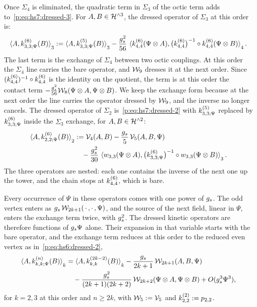 Once $\Sigma_4$ is eliminated, the quadratic term in $\Sigma_3$ of the octic term adds to~\eqref{p:eq:hs7:dressed-3}.
For $A, B \in \mathcal{H}^{\wedge 3}$, the dressed operator of $\Sigma_3$ at this order is:
\begin{equation}
  \label{p:eq:hs8:dressed-3}
  \pair[3]{A}{\kin{3}{\Psi}{6}(B)}
    := \pair[3]{A}{\kin{3}{\Psi}{5}(B)}
      - \frac{\gs^2}{56} \, \pair[4]{\kin{4}{}{6}(\Psi \otimes A)}{\big( \kin{4}{}{6} \big)^{-1} \circ \kin{4}{}{6}(\Psi \otimes B)}.
\end{equation}
The last term is the exchange of $\Sigma_4$ between two octic couplings.
At this order the $\Sigma_4$ line carries the bare operator, and $\mathcal{W}_{9}$ dresses it at the next order.
Since $(\kin{4}{}{6})^{-1} \circ \kin{4}{}{6}$ is the identity on the quotient, the term is at this order the contact term $- \tfrac{g_s^2}{56} \mathcal{W}_{8}(\Psi \otimes A, \Psi \otimes B)$.
We keep the exchange form because at the next order the line carries the operator dressed by $\mathcal{W}_{9}$, and the inverse no longer cancels.
The dressed operator of $\Sigma_2$ is~\eqref{p:eq:hs7:dressed-2} with $\kin{3}{\Psi}{5}$ replaced by $\kin{3}{\Psi}{6}$ inside the $\Sigma_3$ exchange, for $A, B \in \mathcal{H}^{\wedge 2}$:
\begin{equation}
  \label{p:eq:hs8:dressed-2}
  \begin{aligned}
    \pair[2]{A}{\kin{2}{\Psi}{6}(B)}
      &
      := \vertex{4}(A, B)
        - \frac{\gs}{5} \, \vertex{5}(A, B, \Psi)
      \\ &
      \quad
      - \frac{\gs^2}{30} \, \pair[3]{\wprod{3}{3}(\Psi \otimes A)}{\big( \kin{3}{\Psi}{6} \big)^{-1} \circ \wprod{3}{3}(\Psi \otimes B)}.
  \end{aligned}
\end{equation}
The three operators are nested: each one contains the inverse of the next one up the tower, and the chain stops at $\kin{4}{}{6}$, which is bare.


Every occurrence of $\Psi$ in these operators comes with one power of $g_s$.
The odd vertex enters as $g_s \, \mathcal{W}_{2 k + 1}(\, \cdot \,, \cdot \,, \Psi)$, and the source of the next field, linear in $\Psi$, enters the exchange term twice, with $g_s^2$.
The dressed kinetic operators are therefore functions of $g_s \Psi$ alone.
Their expansion in that variable starts with the bare operator, and the exchange term reduces at this order to the reduced even vertex as in~\eqref{p:eq:hs6:dressed-2},
\begin{equation}
  \label{p:eq:hs8:scaling}
  \begin{aligned}
    \pair[k]{A}{\kin{k}{\Psi}{n}(B)}
      &
      = \pair[k]{A}{\kin{k}{}{2 k - 2}(B)}
        - \frac{\gs}{2 k + 1} \, \dvertex{2 k + 1}(A, B, \Psi)
      \\ &
      \quad
      - \frac{\gs^2}{(2 k + 1) (2 k + 2)} \, \dvertex{2 k + 2}(\Psi \otimes A, \Psi \otimes B)
        + O(\gs^3 \Psi^3),
  \end{aligned}
\end{equation}
for $k = 2, 3$ at this order and $n \ge 2 k$, with $\mathcal{W}_{5} := \mathcal{V}_{5}$ and $\kin{2}{}{2} := \sprod{2}{2}$.

